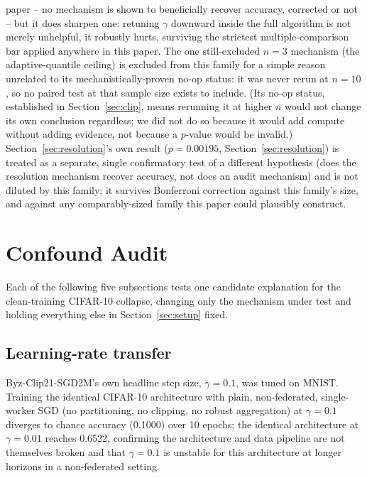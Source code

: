 \documentclass{article}
\begin{document}
paper -- no mechanism is shown to beneficially recover accuracy, corrected or
not -- but it does sharpen one: retuning $\gamma$ downward inside the full
algorithm is not merely unhelpful, it robustly hurts, surviving the strictest
multiple-comparison bar applied anywhere in this paper. The one still-excluded
$n{=}3$ mechanism (the adaptive-quantile ceiling) is excluded from this family
for a simple reason unrelated to its mechanistically-proven no-op status: it
was never rerun at $n{=}10$, so no paired test at that sample size exists to
include. (Its no-op status, established in Section~\ref{sec:clip}, means
rerunning it at higher $n$ would not change its own conclusion regardless; we
did not do so because it would add compute without adding evidence, not
because a $p$-value would be invalid.) Section~\ref{sec:resolution}'s own
result ($p{=}0.00195$, Section~\ref{sec:resolution}) is treated as a separate,
single confirmatory test of a different hypothesis (does the resolution
mechanism recover accuracy, not does an audit mechanism) and is not diluted by
this family; it survives Bonferroni correction against this family's size, and
against any comparably-sized family this paper could plausibly construct.

\section{Confound Audit}
\label{sec:audit}

Each of the following five subsections tests one candidate explanation for the
clean-training CIFAR-10 collapse, changing only the mechanism under test and
holding everything else in Section~\ref{sec:setup} fixed.

\subsection{Learning-rate transfer}
\label{sec:lr}

Byz-Clip21-SGD2M's own headline step size, $\gamma{=}0.1$, was tuned on MNIST.
Training the identical CIFAR-10 architecture with plain, non-federated,
single-worker SGD (no partitioning, no clipping, no robust aggregation) at
$\gamma{=}0.1$ diverges to chance accuracy (0.1000) over 10 epochs; the identical
architecture at $\gamma{=}0.01$ reaches 0.6522, confirming the architecture and
data pipeline are not themselves broken and that $\gamma{=}0.1$ is unstable for
this architecture at longer horizons in a non-federated setting.
\end{document}
